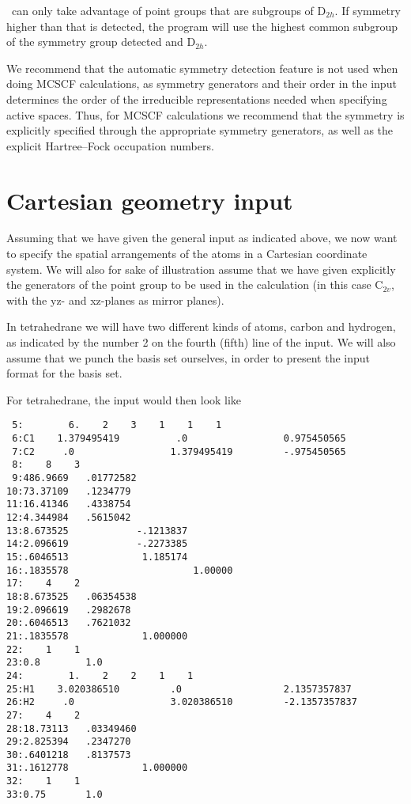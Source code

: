 \dalton\ can only take advantage of point groups that are subgroups
of D$_{2h}$. If symmetry higher than that is detected, the program
will use the highest common subgroup of  the symmetry group
detected and D$_{2h}$.

We recommend that the automatic symmetry detection feature is not
used when doing MCSCF calculations, as symmetry
generators and their order in the input
determines the order of the irreducible representations
needed when specifying active spaces. Thus, for MCSCF calculations
we recommend that the symmetry is  explicitly specified through
the appropriate symmetry generators, as well as the explicit
Hartree--Fock occupation numbers.

\section{Cartesian geometry input}\label{sec:molcart}

Assuming that we have given the general input as indicated above, we
now want to specify the spatial arrangements of the atoms in a
Cartesian coordinate system. We will also for sake of illustration
assume that we have given explicitly the generators of the point group
to be used in the calculation (in this case C$_{2v}$, with the yz- and
xz-planes as mirror planes).

In tetrahedrane we will have two different kinds of atoms, carbon
and hydrogen, as indicated by the number 2 on the fourth (fifth)
line of the input. We will also assume that we punch the basis set
ourselves, in order to present the input format for the basis set.

For tetrahedrane, the input would then look like
\begin{verbatim}
 5:        6.    2    3    1    1    1
 6:C1    1.379495419          .0                 0.975450565
 7:C2     .0                 1.379495419         -.975450565
 8:    8    3
 9:486.9669   .01772582
10:73.37109   .1234779
11:16.41346   .4338754
12:4.344984   .5615042
13:8.673525            -.1213837
14:2.096619            -.2273385
15:.6046513             1.185174
16:.1835578                      1.00000
17:    4    2
18:8.673525   .06354538
19:2.096619   .2982678
20:.6046513   .7621032
21:.1835578             1.000000
22:    1    1
23:0.8        1.0
24:        1.    2    2    1    1
25:H1    3.020386510         .0                  2.1357357837
26:H2     .0                 3.020386510         -2.1357357837
27:    4    2
28:18.73113   .03349460
29:2.825394   .2347270
30:.6401218   .8137573
31:.1612778             1.000000
32:    1    1
33:0.75       1.0
\end{verbatim}

